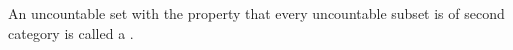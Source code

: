 An uncountable set with the property that every uncountable subset is of second category is called a .

